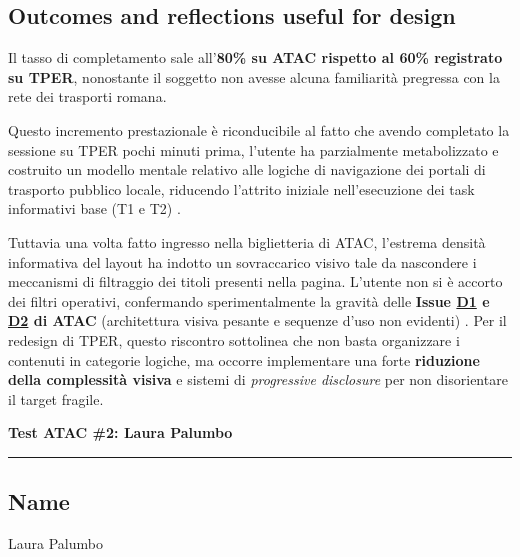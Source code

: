 ﻿\documentclass[11pt,a4paper]{article}
\begin{document}
\subsection*{Outcomes and reflections useful for design}
\begin{tcolorbox}[base]
Il tasso di completamento sale all'\textbf{80\% su ATAC rispetto al 60\% registrato su TPER}, nonostante il soggetto non avesse alcuna familiarità pregressa con la rete dei trasporti romana.

Questo incremento prestazionale è riconducibile al fatto che avendo completato la sessione su TPER pochi minuti prima, l'utente ha parzialmente metabolizzato e costruito un modello mentale relativo alle logiche di navigazione dei portali di trasporto pubblico locale, riducendo l'attrito iniziale nell'esecuzione dei task informativi base (T1 e T2) .

Tuttavia una volta fatto ingresso nella biglietteria di ATAC, l'estrema densità informativa del layout ha indotto un sovraccarico visivo tale da nascondere i meccanismi di filtraggio dei titoli presenti nella pagina. L'utente non si è accorto dei filtri operativi, confermando sperimentalmente la gravità delle \textbf{Issue \hyperref[atac:D1]{D1} e \hyperref[atac:D2]{D2} di ATAC} (architettura visiva pesante e sequenze d'uso non evidenti) . Per il redesign di TPER, questo riscontro sottolinea che non basta organizzare i contenuti in categorie logiche, ma occorre implementare una forte \textbf{riduzione della complessità visiva} e sistemi di \textit{progressive disclosure} per non disorientare il target fragile.
\end{tcolorbox}


\newpage
\begin{center}
  {\color{secondaryColor}\large\bfseries
  Test ATAC \#2: Laura Palumbo}\\
  \vspace{0.1cm}
  \color{borderColor}\hrule
\end{center}

\vspace{0.5cm}

\subsection*{Name}
\begin{tcolorbox}[base]
Laura Palumbo
\end{tcolorbox}
\end{document}
